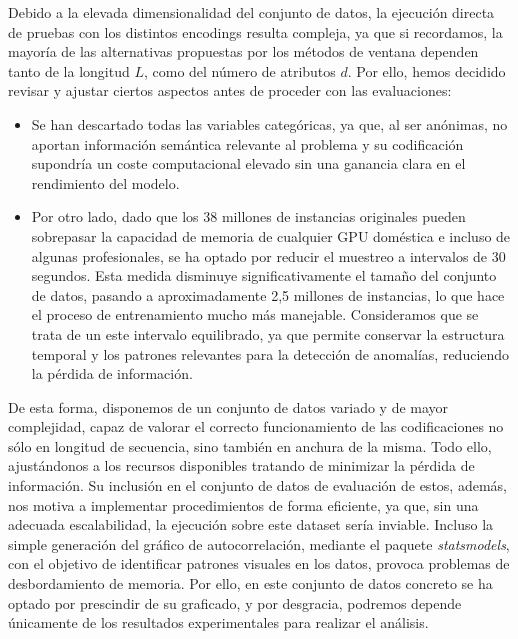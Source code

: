 Debido a la elevada dimensionalidad del conjunto de datos, la ejecución directa de pruebas con los distintos encodings resulta compleja, ya que si recordamos, la mayoría de las alternativas propuestas por los métodos de ventana dependen tanto de la longitud $L$, como del número de atributos $d$. Por ello, hemos decidido revisar y ajustar ciertos aspectos antes de proceder con las evaluaciones:

\begin{itemize}
	\item Se han descartado todas las variables categóricas, ya que, al ser anónimas, no aportan información semántica relevante al problema y su codificación supondría un coste computacional elevado sin una ganancia clara en el rendimiento del modelo.
	\item Por otro lado, dado que los 38 millones de instancias originales pueden sobrepasar la capacidad de memoria de cualquier GPU doméstica e incluso de algunas profesionales, se ha optado por reducir el muestreo a intervalos de 30 segundos. Esta medida disminuye significativamente el tamaño del conjunto de datos, pasando a aproximadamente 2,5 millones de instancias, lo que hace el proceso de entrenamiento mucho más manejable. Consideramos que se trata de un este intervalo equilibrado, ya que permite conservar la estructura temporal y los patrones relevantes para la detección de anomalías, reduciendo la pérdida de información.
\end{itemize}

De esta forma, disponemos de un conjunto de datos variado y de mayor complejidad, capaz de valorar el correcto funcionamiento de las codificaciones no sólo en longitud de secuencia, sino también en anchura de la misma. Todo ello, ajustándonos a los recursos disponibles tratando de minimizar la pérdida de información. Su inclusión en el conjunto de datos de evaluación de estos, además, nos motiva a implementar procedimientos de forma eficiente, ya que, sin una adecuada escalabilidad, la ejecución sobre este dataset sería inviable. Incluso la simple generación del gráfico de autocorrelación, mediante el paquete \textit{statsmodels}, con el objetivo de identificar patrones visuales en los datos, provoca problemas de desbordamiento de memoria. Por ello, en este conjunto de datos concreto se ha optado por prescindir de su graficado, y por desgracia, podremos depende únicamente de los resultados experimentales para realizar el análisis.



